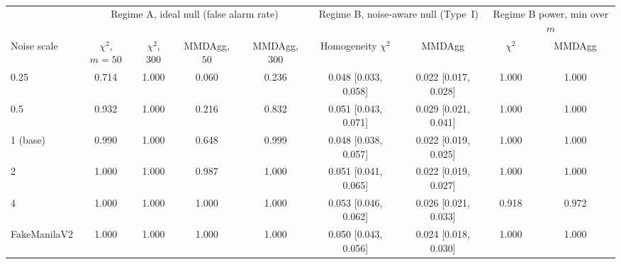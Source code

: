 \begin{table}[ht]
\centering
\caption{}
\label{tab:noisy}
\footnotesize
\setlength{\tabcolsep}{3.5pt}
\begin{tabular}{l cc cc cc cc}
\toprule
& \multicolumn{4}{c}{Regime A, ideal null (false alarm rate)} & \multicolumn{2}{c}{Regime B, noise-aware null (Type~I)} & \multicolumn{2}{c}{Regime B power, min over $m$} \\
\cmidrule(lr){2-5} \cmidrule(lr){6-7} \cmidrule(lr){8-9}
Noise scale & $\chi^2$, $m{=}50$ & $\chi^2$, $300$ & MMDAgg, $50$ & MMDAgg, $300$ & Homogeneity $\chi^2$ & MMDAgg & $\chi^2$ & MMDAgg \\
\midrule
0.25 & 0.714 & 1.000 & 0.060 & 0.236 & 0.048 [0.033, 0.058] & 0.022 [0.017, 0.028] & 1.000 & 1.000 \\
0.5 & 0.932 & 1.000 & 0.216 & 0.832 & 0.051 [0.043, 0.071] & 0.029 [0.021, 0.041] & 1.000 & 1.000 \\
1 (base) & 0.990 & 1.000 & 0.648 & 0.999 & 0.048 [0.038, 0.057] & 0.022 [0.019, 0.025] & 1.000 & 1.000 \\
2 & 1.000 & 1.000 & 0.987 & 1.000 & 0.051 [0.041, 0.065] & 0.022 [0.019, 0.027] & 1.000 & 1.000 \\
4 & 1.000 & 1.000 & 1.000 & 1.000 & 0.053 [0.046, 0.062] & 0.026 [0.021, 0.033] & 0.918 & 0.972 \\
FakeManilaV2 & 1.000 & 1.000 & 1.000 & 1.000 & 0.050 [0.043, 0.056] & 0.024 [0.018, 0.030] & 1.000 & 1.000 \\
\bottomrule
\end{tabular}
\end{table}
